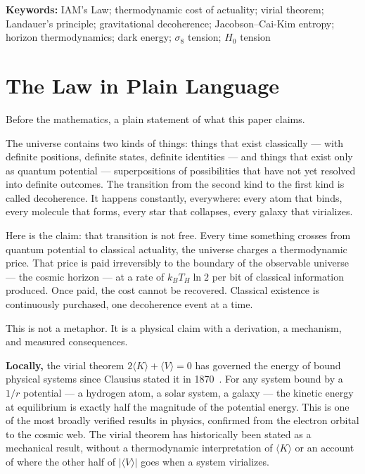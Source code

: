 \documentclass[12pt,a4paper]{article}
\begin{document}
\noindent\textbf{Keywords:} IAM's Law; thermodynamic cost of actuality;
virial theorem; Landauer's principle; gravitational decoherence;
Jacobson--Cai-Kim entropy; horizon thermodynamics; dark energy;
$\sigma_8$ tension; $H_0$ tension

\section{The Law in Plain Language}
\label{sec:plain}

Before the mathematics, a plain statement of what this paper claims.

The universe contains two kinds of things: things that exist
classically --- with definite positions, definite states, definite
identities --- and things that exist only as quantum potential ---
superpositions of possibilities that have not yet resolved into definite
outcomes. The transition from the second kind to the first kind is
called decoherence. It happens constantly, everywhere: every atom that
binds, every molecule that forms, every star that collapses, every
galaxy that virializes.

Here is the claim: that transition is not free. Every time something
crosses from quantum potential to classical actuality, the universe
charges a thermodynamic price. That price is paid irreversibly to the
boundary of the observable universe --- the cosmic horizon --- at a rate
of $k_B T_H \ln 2$ per bit of classical information produced. Once
paid, the cost cannot be recovered. Classical existence is continuously
purchased, one decoherence event at a time.

This is not a metaphor. It is a physical claim with a derivation, a
mechanism, and measured consequences.

\textbf{Locally,} the virial theorem $2\langle K \rangle + \langle V
\rangle = 0$ has governed the energy of bound physical systems since
Clausius stated it in 1870~\citep{Clausius1870}. For any system bound by
a $1/r$ potential --- a hydrogen atom, a solar system, a galaxy --- the
kinetic energy at equilibrium is exactly half the magnitude of the
potential energy. This is one of the most broadly verified results in
physics, confirmed from the electron orbital to the cosmic web. The
virial theorem has historically been stated as a mechanical result,
without a thermodynamic interpretation of $\langle K \rangle$ or an
account of where the other half of $|\langle V \rangle|$ goes when a
system virializes.
\end{document}

